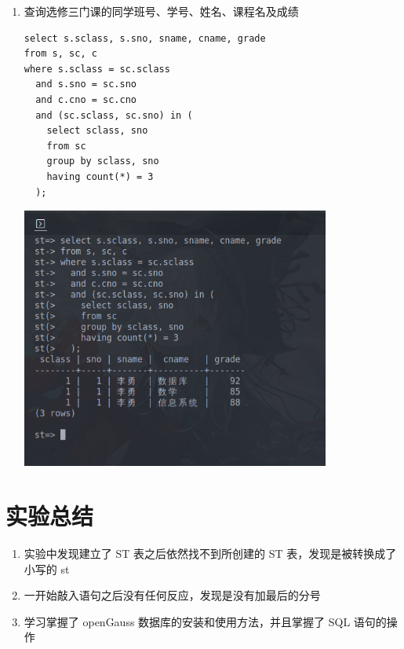 \documentclass[hyperref,UTF8,12pt,a4paper]{ctexart}
\begin{document}
\begin{enumerate}
\item 查询选修三门课的同学班号、学号、姓名、课程名及成绩

\begin{verbatim}
select s.sclass, s.sno, sname, cname, grade
from s, sc, c
where s.sclass = sc.sclass
  and s.sno = sc.sno
  and c.cno = sc.cno
  and (sc.sclass, sc.sno) in (
    select sclass, sno
    from sc
    group by sclass, sno
    having count(*) = 3
  );
\end{verbatim}

\begin{center}
\includegraphics[width=0.8\textwidth]{23.png}
\end{center}

\end{enumerate}

\section{实验总结}

\begin{enumerate}
	\item 实验中发现建立了 ST 表之后依然找不到所创建的 ST 表，发现是被转换成了小写的 st
	\item 一开始敲入语句之后没有任何反应，发现是没有加最后的分号
	\item 学习掌握了 openGauss 数据库的安装和使用方法，并且掌握了 SQL 语句的操作
\end{enumerate}
\end{document}

